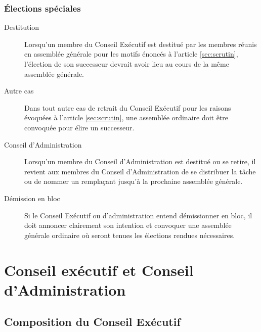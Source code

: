 \documentclass{aediroum}
\newcommand{\article}[1]{article \ref{#1}}
\begin{document}
\subsubsection{Élections spéciales}\label{sec:elections-speciales}

\begin{description}
\item[Destitution] Lorsqu'un membre du Conseil Exécutif est destitué par les membres réunis en assemblée générale pour les motifs énoncés à l'\article{sec:scrutin}, l'élection de son successeur devrait avoir lieu au cours de la même assemblée générale.
\item[Autre cas] Dans tout autre cas de retrait du Conseil Exécutif pour les raisons évoquées à l'\article{sec:scrutin}, une assemblée ordinaire doit être convoquée pour élire un successeur.
\item[Conseil d'Administration] Lorsqu'un membre du Conseil d'Administration est destitué ou se retire, il revient aux membres du Conseil d'Administration de se distribuer la tâche ou de nommer un remplaçant jusqu'à la prochaine assemblée générale.
\item[Démission en bloc] Si le Conseil Exécutif ou d'administration entend démissionner en bloc, il doit annoncer clairement son intention et convoquer une assemblée générale ordinaire où seront tenues les élections rendues nécessaires.
\end{description}


\section{Conseil exécutif et Conseil d'Administration}\label{sec:conseil-executif-et-conseil-dadministration}
\subsection{Composition du Conseil Exécutif}\label{sec:composition-du-conseil-executif}
\end{document}
